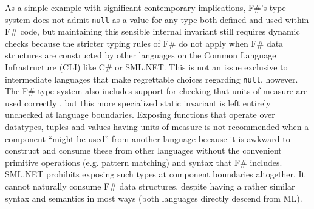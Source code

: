 As a simple example with significant contemporary implications, F\#'s type system does not admit \verb|null| as a value for any type both defined and used within F\# code, but maintaining this sensible internal invariant still requires dynamic  checks because the stricter typing rules of F\# do not apply when F\# data structures are constructed by other languages on the Common Language Infrastructure (CLI) like C\# or SML.NET. This is not an issue exclusive to intermediate languages that make regrettable choices regarding \verb|null|, however. The F\# type system also includes support for checking that units of measure are used correctly \cite{syme2012expert, kennedy1994dimension}, but this more specialized static invariant is left entirely unchecked at language boundaries. Exposing functions that operate over datatypes, tuples and values having units of measure is not recommended when a component ``might be used'' from another language \cite{syme2012expert} because it is awkward to construct and consume these from other languages without the convenient primitive operations (e.g. pattern matching) and syntax that F\# includes. SML.NET prohibits exposing such types at component boundaries altogether. It cannot naturally consume F\# data structures, despite having a rather similar syntax and semantics in most ways (both languages directly descend from ML). 

